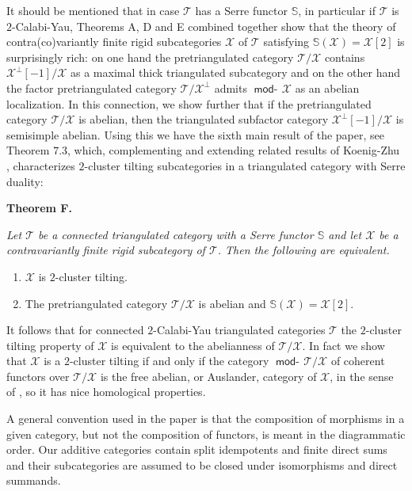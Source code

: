 \documentclass[oneside, a4paper,reqno]{amsart}
\numberwithin{equation}{section}
\theoremstyle{definition}
\begin{document}
It should be mentioned that in case ${\mathcal T}$ has a Serre functor $\mathbb S$, in particular if ${\mathcal T}$ is $2$-Calabi-Yau, Theorems A, D and E combined together show that the theory of contra(co)variantly finite rigid subcategories ${\mathcal X}$ of ${\mathcal T}$ satisfying $\mathbb S({\mathcal X}) = {\mathcal X}[2]$ is surprisingly  rich: on one hand the pretriangulated category ${\mathcal T}/{\mathcal X}$ contains ${\mathcal X}^{\bot}[-1]/{\mathcal X}$ as a maximal thick triangulated subcategory and on the other hand the factor pretriangulated category ${\mathcal T}/{\mathcal X}^{\bot}$ admits $\operatorname*{\mathsf{mod}-\!}{\mathcal X}$ as an abelian localization. In this connection, we show further that if the pretriangulated category ${\mathcal T}/{\mathcal X}$ is abelian, then  the triangulated subfactor  category ${\mathcal X}^{\bot}[-1]/{\mathcal X}$ is semisimple abelian. Using this 
we have the sixth main result of the paper, see Theorem $7.3$, which, complementing and extending related results of Koenig-Zhu \cite{KZ}, characterizes $2$-cluster tilting subcategories in a triangulated category with Serre duality:

\medskip

{\bf Theorem F.} {\em Let ${\mathcal T}$ be a connected triangulated category with  a Serre functor $\mathbb S$ and let ${\mathcal X}$ be a contravariantly finite rigid subcategory of ${\mathcal T}$.  Then the following are equivalent. 
\begin{enumerate}
\item ${\mathcal X}$ is $2$-cluster tilting.
\item The pretriangulated category ${\mathcal T}/{\mathcal X}$ is abelian and $\mathbb S({\mathcal X}) = {\mathcal X}[2]$.   
\end{enumerate} 
}

\medskip

It follows that for connected $2$-Calabi-Yau triangulated categories ${\mathcal T}$ the $2$-cluster tilting property of ${\mathcal X}$ is equivalent to the abelianness of ${\mathcal T}/{\mathcal X}$. In fact we show that ${\mathcal X}$ is a $2$-cluster tilting  if and only if the category $\operatorname*{\mathsf{mod}-\!}{\mathcal T}/{\mathcal X}$ of coherent functors over ${\mathcal T}/{\mathcal X}$ is the free abelian, or Auslander, category of ${\mathcal X}$, in the sense of \cite{B:freyd}, so it has nice homological properties.  
     
 A general convention used in the paper is that the composition of morphisms in a given category, but not the composition of functors, is meant in the diagrammatic order. Our additive categories contain split idempotents and finite direct sums and their subcategories are assumed to be closed under isomorphisms and direct summands. 
 
\end{document}
